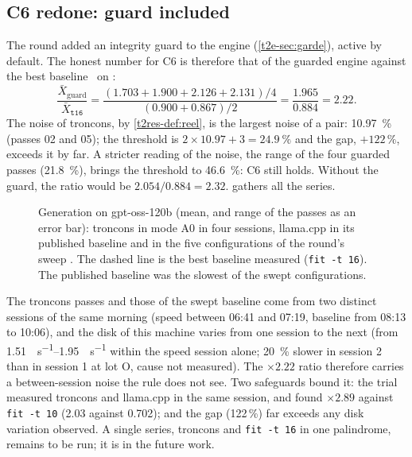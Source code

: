 \subsection{C6 redone: guard included}\label{t2res-sec:c6}

The round added an integrity guard to the engine (\cref{t2e-sec:garde}), active by default. The honest number for C6 is therefore that of the guarded engine against the best baseline \calc~on \mes:
\[
\frac{\bar X_{\text{guard}}}{\bar X_{\texttt{t16}}} = \frac{(1.703 + 1.900 + 2.126 + 2.131)/4}{(0.900 + 0.867)/2} = \frac{1.965}{0.884} = \mathbf{2.22}.
\]
The noise of troncons, by \cref{t2res-def:reel}, is the largest noise of a pair: \SI{10.97}{\percent} (passes 02 and 05); the threshold is $2 \times 10.97 + 3 = \SI{24.9}{\percent}$ and the gap, $+122\,\%$, exceeds it by far. A stricter reading of the noise, the range of the four guarded passes (\SI{21.8}{\percent}), brings the threshold to \SI{46.6}{\percent}: C6 still holds. Without the guard, the ratio would be $2.054 / 0.884 = 2.32$.  gathers all the series.

\begin{figure}[ht]
\centering
\GrapheResVitesse
\caption[Generation: troncons against llama.cpp]{Generation on gpt-oss-120b (mean, and range of the passes as an error bar): troncons in mode A0 in four sessions, llama.cpp in its published baseline and in the five configurations of the round's sweep \mes. The dashed line is the best baseline measured (\texttt{fit -t 16}). The published baseline was the slowest of the swept configurations.}
\label{t2res-fig:vitesse}
\end{figure}

\begin{remarque}
The troncons passes and those of the swept baseline come from two distinct sessions of the same morning (speed between 06:41 and 07:19, baseline from 08:13 to 10:06), and the disk of this machine varies from one session to the next (from \SIrange{1.51}{1.95}{\Go\per\second} within the speed session alone; \SI{20}{\percent} slower in session 2 than in session 1 at lot O, cause not measured). The $\times 2.22$ ratio therefore carries a between-session noise the rule does not see. Two safeguards bound it: the trial measured troncons and llama.cpp in the same session, and found $\times 2.89$ against \texttt{fit -t 10} (\num{2.03} against \num{0.702}); and the gap (122\,\%) far exceeds any disk variation observed. A single series, troncons and \texttt{fit -t 16} in one palindrome, remains to be run; it is in the future work.
\end{remarque}

